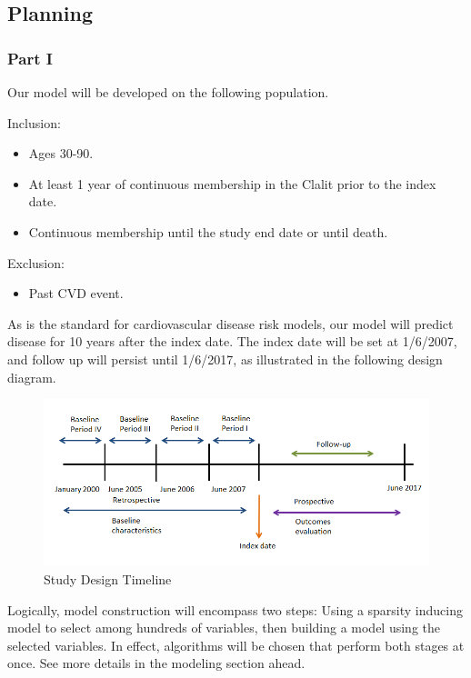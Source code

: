 \documentclass[a4paper,12pt]{article}
\begin{document}
	\subsection{Planning}
	
		\subsubsection{Part I}
		Our model will be developed on the following population.
		
		Inclusion:
		\begin{itemize}
			\item Ages 30-90.
			\item At least 1 year of continuous membership in the Clalit prior to the index date.
			\item Continuous membership until the study end date or until death.
		\end{itemize}
		Exclusion:
		\begin{itemize}
			\item Past CVD event.
		\end{itemize}
		
		As is the standard for cardiovascular disease risk models, our model will predict disease for 10 years after the index date. The index date will be set at 1/6/2007, and follow up will persist until 1/6/2017, as illustrated in the following design diagram.
		
		\begin{figure}[h]
			\centering
			\includegraphics[width=\textwidth]{prelim-results/Panpredictor/timeline.png}
			\caption{Study Design Timeline}
		\end{figure}
		
		Logically, model construction will encompass two steps: Using a sparsity inducing model to select among hundreds of variables, then building a model using the selected variables. In effect, algorithms will be chosen that perform both stages at once. See more details in the modeling section ahead.
		
\end{document}
